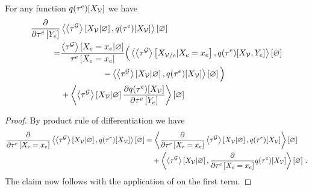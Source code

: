 \begin{lemma}
    \label{lem:difMNExpectation}
    For any function $q(\tau^{e})[X_{\mathcal{V}}]$ we have
    \begin{align*}
        \frac{\partial }{\partial \tau^{e}\left[Y_{e}\right]} &
        \left\langle \left\langle \tau^{\mathcal{G}}\right\rangle \left[ X_{\mathcal{V}} | \varnothing \right],q(\tau^{e})[X_{\mathcal{V}}]\right\rangle \left[ \varnothing \right] \\
        = &
        \frac{\left\langle \tau^{\mathcal{G}}\right\rangle \left[ X_{e}=x_{e} | \varnothing \right]}{\tau^{e}\left[X_{e}=x_{e}\right]}
        \Big( \left\langle \left\langle \tau^{\mathcal{G}}\right\rangle \left[ X_{\mathcal{V}/e} | X_{e}=x_{e} \right], q(\tau^{e})[X_{\mathcal{V}},Y_{e}]\right\rangle \left[ \varnothing \right] \\
        & \quad \quad \quad \quad \quad - \left\langle \left\langle \tau^{\mathcal{G}}\right\rangle \left[ X_{\mathcal{V}} | \varnothing \right], q(\tau^{e})[X_{\mathcal{V}}]\right\rangle \left[ \varnothing \right]
        \Big) \\
        & + \left\langle  \left\langle \tau^{\mathcal{G}}\right\rangle \left[ X_{\mathcal{V}} | \varnothing \right]
        \frac{\partial q(\tau^{e})[X_{\mathcal{V}}]}{\partial \tau^{e}\left[Y_{e}\right]}
        \right\rangle \left[ \varnothing \right]
    \end{align*}
\end{lemma}
\begin{proof}
    By product rule of differentiation we have
    \begin{align*}
        \frac{\partial }{\partial \tau^{e}\left[X_{e}=x_{e}\right]} \left\langle \left\langle \tau^{\mathcal{G}}\right\rangle \left[ X_{\mathcal{V}} | \varnothing \right],q(\tau^{e})[X_{\mathcal{V}}]\right\rangle \left[ \varnothing \right]
        & =  \left\langle \frac{\partial }{\partial \tau^{e}\left[X_{e}=x_{e}\right]}\left\langle \tau^{\mathcal{G}}\right\rangle \left[ X_{\mathcal{V}} | \varnothing \right],q(\tau^{e})[X_{\mathcal{V}}]\right\rangle \left[ \varnothing \right] \\
        & \quad +  \left\langle \left\langle \tau^{\mathcal{G}}\right\rangle \left[ X_{\mathcal{V}} | \varnothing \right],\frac{\partial }{\partial \tau^{e}\left[X_{e}=x_{e}\right]}q(\tau^{e})[X_{\mathcal{V}}]\right\rangle \left[ \varnothing \right]  \, .
    \end{align*}
    The claim now follows with the application of  on the first term.
\end{proof}

